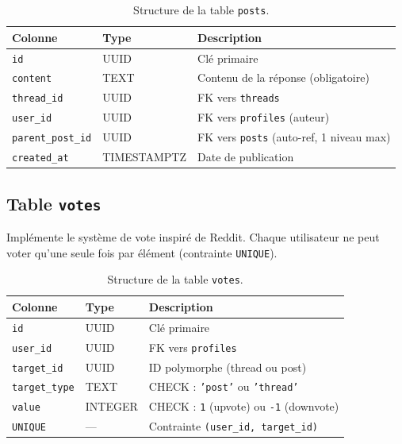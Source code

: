 \documentclass[12pt, a4paper]{report}
\begin{document}
\begin{table}[H]
\centering
\renewcommand{\arraystretch}{1.3}
\begin{tabularx}{\textwidth}{l l X}
\toprule
\textbf{Colonne} & \textbf{Type} & \textbf{Description} \\
\midrule
\texttt{id} & UUID & Clé primaire \\
\texttt{content} & TEXT & Contenu de la réponse (obligatoire) \\
\texttt{thread\_id} & UUID & FK vers \texttt{threads} \\
\texttt{user\_id} & UUID & FK vers \texttt{profiles} (auteur) \\
\texttt{parent\_post\_id} & UUID & FK vers \texttt{posts} (auto-ref, 1 niveau max) \\
\texttt{created\_at} & TIMESTAMPTZ & Date de publication \\
\bottomrule
\end{tabularx}
\caption{Structure de la table \texttt{posts}.}
\end{table}

\subsection{Table \texttt{votes}}

Implémente le système de vote inspiré de Reddit. Chaque utilisateur ne peut voter qu'une seule fois par élément (contrainte \texttt{UNIQUE}).

\begin{table}[H]
\centering
\renewcommand{\arraystretch}{1.3}
\begin{tabularx}{\textwidth}{l l X}
\toprule
\textbf{Colonne} & \textbf{Type} & \textbf{Description} \\
\midrule
\texttt{id} & UUID & Clé primaire \\
\texttt{user\_id} & UUID & FK vers \texttt{profiles} \\
\texttt{target\_id} & UUID & ID polymorphe (thread ou post) \\
\texttt{target\_type} & TEXT & CHECK : \texttt{'post'} ou \texttt{'thread'} \\
\texttt{value} & INTEGER & CHECK : \texttt{1} (upvote) ou \texttt{-1} (downvote) \\
\texttt{UNIQUE} & --- & Contrainte \texttt{(user\_id, target\_id)} \\
\bottomrule
\end{tabularx}
\caption{Structure de la table \texttt{votes}.}
\end{table}
\end{document}
